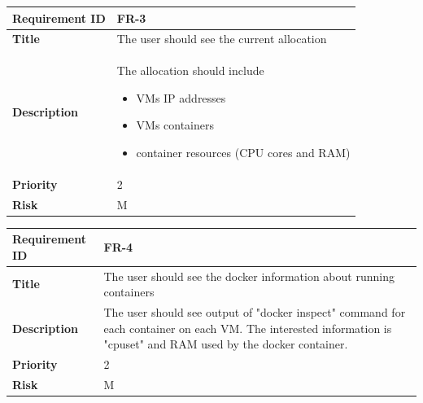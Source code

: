 \begin{table}[ht]
  \begin{tabular}{|p{3.5cm}|p{8cm}|}
  \hline
    \textbf{Requirement ID}  & FR-3 \\
  \hline
    \textbf{Title}  & \begin{sloppypar}The user should see the current allocation\end{sloppypar}\\
  \hline
    \textbf{Description}  & \begin{sloppypar}The allocation should include
    \begin{itemize}
        \item VMs IP addresses
        \item VMs containers
        \item container resources (CPU cores and RAM)
    \end{itemize}
    \end{sloppypar}\\
  \hline
    \textbf{Priority}  & 2\\
  \hline
    \textbf{Risk}  & M \\
  \hline
  \end{tabular}
\end{table}

\begin{table}[ht]
  \begin{tabular}{|p{3.5cm}|p{8cm}|}
  \hline
    \textbf{Requirement ID}  & FR-4 \\
  \hline
    \textbf{Title}  & \begin{sloppypar}The user should see the docker information about running containers  \end{sloppypar}\\
  \hline
    \textbf{Description}  & \begin{sloppypar}The user should see output of "docker inspect" command for each container on each VM. The interested information is "cpuset" and RAM used by the docker container.\end{sloppypar}\\
  \hline
    \textbf{Priority}  & 2\\
  \hline
    \textbf{Risk}  & M \\
  \hline
  \end{tabular}
\end{table}

